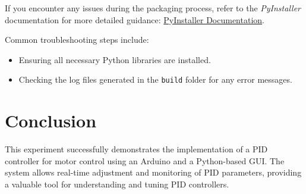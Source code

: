 \documentclass{article}
\begin{document}
If you encounter any issues during the packaging process, refer to the \textit{PyInstaller} documentation for more detailed guidance: \href{https://pyinstaller.readthedocs.io/en/stable/}{PyInstaller Documentation}.

Common troubleshooting steps include:
\begin{itemize}
    \item Ensuring all necessary Python libraries are installed.
    \item Checking the log files generated in the \texttt{build} folder for any error messages.
\end{itemize}


\section{Conclusion}
This experiment successfully demonstrates the implementation of a PID controller for motor control using an Arduino and a Python-based GUI. The system allows real-time adjustment and monitoring of PID parameters, providing a valuable tool for understanding and tuning PID controllers.
\end{document}

